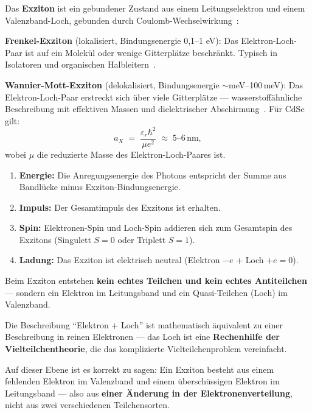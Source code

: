Das \textbf{Exziton} ist ein gebundener Zustand aus einem
Leitungselektron und einem Valenzband-Loch, gebunden durch
Coulomb-Wechselwirkung~\cite{Frenkel1931,Wannier1937}:

\textbf{Frenkel-Exziton} (lokalisiert, Bindungsenergie 0,1--1 eV):
Das Elektron-Loch-Paar ist auf ein Molekül oder wenige
Gitterplätze beschränkt. Typisch in Isolatoren und
organischen Halbleitern~\cite{Frenkel1931}.

\textbf{Wannier-Mott-Exziton} (delokalisiert, Bindungsenergie $\sim$meV--100\,meV):
Das Elektron-Loch-Paar erstreckt sich über viele Gitterplätze ---
wasserstoffähnliche Beschreibung mit effektiven Massen und
dielektrischer Abschirmung~\cite{Wannier1937}. Für CdSe gilt:
\begin{equation}
  a_X \;=\; \frac{\varepsilon_r \hbar^2}{\mu e^2} \;\approx\; 5\text{--}6\,\text{nm},
\end{equation}
wobei $\mu$ die reduzierte Masse des Elektron-Loch-Paares ist.

\begin{keyresult}
\begin{enumerate}
  \item \textbf{Energie:} Die Anregungsenergie des Photons
    entspricht der Summe aus Bandlücke minus Exziton-Bindungsenergie.
  \item \textbf{Impuls:} Der Gesamtimpuls des Exzitons ist erhalten.
  \item \textbf{Spin:} Elektronen-Spin und Loch-Spin addieren sich
    zum Gesamtspin des Exzitons (Singulett $S=0$ oder Triplett $S=1$).
  \item \textbf{Ladung:} Das Exziton ist elektrisch neutral
    (Elektron $-e$ + Loch $+e = 0$).
\end{enumerate}
\end{keyresult}

\begin{important}
Beim Exziton entstehen \textbf{kein echtes Teilchen und kein echtes
Antiteilchen} --- sondern ein Elektron im Leitungsband und
ein Quasi-Teilchen (Loch) im Valenzband.

Die Beschreibung ``Elektron + Loch'' ist mathematisch
äquivalent zu einer Beschreibung in reinen Elektronen ---
das Loch ist eine \textbf{Rechenhilfe der Vielteilchentheorie},
die das komplizierte Vielteilchenproblem vereinfacht.

Auf dieser Ebene ist es korrekt zu sagen:
Ein Exziton besteht aus einem fehlenden Elektron im Valenzband
und einem überschüssigen Elektron im Leitungsband ---
also aus \textbf{einer Änderung in der Elektronenverteilung},
nicht aus zwei verschiedenen Teilchensorten.
\end{important}

